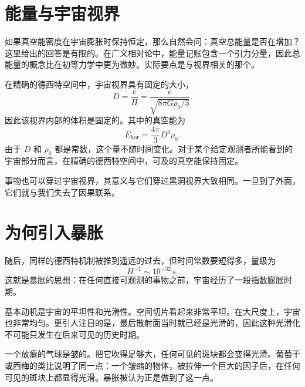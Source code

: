 \section{能量与宇宙视界}

如果真空能密度在宇宙膨胀时保持恒定，那么自然会问：真空总能量是否在增加？这里给出的回答是有限的。在广义相对论中，能量记账包含一个引力分量，因此总能量的概念比在初等力学中更为微妙。实际要点是与视界相关的那个。

在精确的德西特空间中，宇宙视界具有固定的大小，
\begin{equation}
D=\frac{c}{H}
=\frac{c}{\sqrt{8\pi G\rho_0/3}}.
\end{equation}
因此该视界内部的体积是固定的。其中的真空能为
\begin{equation}
E_{\mathrm{hor}}=\frac{4\pi}{3}D^3\rho_0.
\end{equation}
由于 \(D\) 和 \(\rho_0\) 都是常数，这个量不随时间变化。对于某个给定观测者所能看到的宇宙部分而言，在精确的德西特空间中，可及的真空能保持固定。

事物也可以穿过宇宙视界，其意义与它们穿过黑洞视界大致相同。一旦到了外面，它们就与我们失去了因果联系。

\begin{classroomqa}
\end{classroomqa}

\section{为何引入暴胀}

随后，同样的德西特机制被推到遥远的过去，但时间常数要短得多，量级为
\begin{equation}
H^{-1}\sim 10^{-32}\,\mathrm{s}.
\end{equation}
这就是暴胀的思想：在任何直接可观测的事物之前，宇宙经历了一段指数膨胀时期。

基本动机是宇宙的平坦性和光滑性。空间切片看起来非常平坦。在大尺度上，宇宙也非常均匀。更引人注目的是，最后散射面当时就已经是光滑的，因此这种光滑化不可能只发生在后来可见的历史时期。

一个放瘪的气球是皱的。把它吹得足够大，任何可见的斑块都会变得光滑。葡萄干或西梅的类比说明了同一点：一个皱缩的物体，被拉伸一个巨大的因子后，在任何可见的斑块上都显得光滑。暴胀被认为正是做到了这一点。

